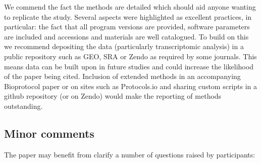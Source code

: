 \documentclass[10pt]{article}
\begin{document}
\par\null

We commend the fact the methods are detailed which should aid anyone
wanting to replicate the study. Several aspects were highlighted as
excellent practices, in particular: the fact that all program versions
are provided, software parameters are included and accessions and
materials are well catalogued. To build on this we recommend depositing
the data (particularly transcriptomic analysis) in a public repository
such as GEO, SRA or Zendo as required by some journals. This means data
can be built upon in future studies and could increase the likelihood of
the paper being cited. Inclusion of extended methods in an accompanying
Bioprotocol paper or on sites such as Protocols.io and sharing custom
scripts in a github repository (or on Zendo) would make the reporting of
methods outstanding.~

\par\null

\subsection*{Minor comments}

{\label{868571}}

The paper may benefit from clarify a number of questions raised by
participants: ~~
\end{document}
